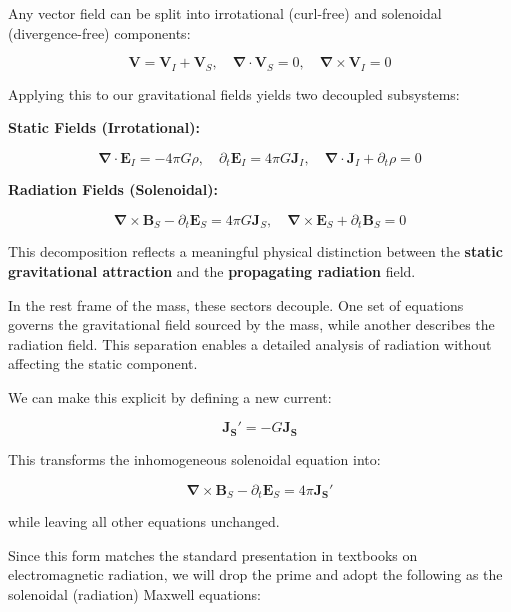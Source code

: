 \documentclass {article}
\renewcommand\vec{\mathbf}
\let\OldS\nabla
\renewcommand{\nabla}{\boldsymbol{\OldS}}
\begin{document}
Any vector field can be split into irrotational (curl-free) and solenoidal (divergence-free) components:

\begin{equation}
\vec{V} = \vec{V}_I + \vec{V}_S, \quad 
\nabla \cdot \vec{V}_S = 0, \quad 
\nabla \times \vec{V}_I = 0
\end{equation}

Applying this to our gravitational fields yields two decoupled subsystems:

\vspace{0.5em}
\noindent\textbf{Static Fields (Irrotational):}

\begin{equation}
\nabla \cdot \vec{E}_I = -4 \pi G \rho, \quad 
\partial_t \vec{E}_I = 4 \pi G \vec{J}_I, \quad 
\nabla \cdot \vec{J}_I + \partial_t \rho = 0
\end{equation}

\noindent\textbf{Radiation Fields (Solenoidal):}


\begin{equation}
\nabla \times \vec{B}_S - \partial_t \vec{E}_S = 4 \pi G \vec{J}_S, \quad 
\nabla \times \vec{E}_S + \partial_t \vec{B}_S = 0
\end{equation}

This decomposition reflects a meaningful physical distinction between the \textbf{static gravitational attraction} and the \textbf{propagating radiation} field.

In the rest frame of the mass, these sectors decouple. One set of equations governs the gravitational field sourced by the mass, while another describes the radiation field. This separation enables a detailed analysis of radiation without affecting the static component.

We can make this explicit by defining a new current:


\begin{equation}
\vec {J_S'} = - G \vec {J_S}
\end{equation}

This transforms the inhomogeneous solenoidal equation into:

\begin{equation}
\nabla \times \vec B_S - \partial_t \vec E_S =  4 \pi \vec {J_S'}
\end{equation}

while leaving all other equations unchanged.

Since this form matches the standard presentation in textbooks on electromagnetic radiation, we will drop the prime and adopt the following as the solenoidal (radiation) Maxwell equations:
\end{document}
